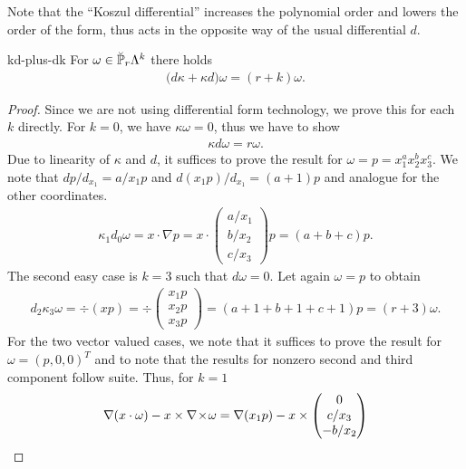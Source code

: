 Note that the ``Koszul differential'' increases the polynomial order
and lowers the order of the form, thus acts in the opposite way of the
usual differential $d$.

\begin{Lemma}{kd-plus-dk}
  For $\omega\in \breve \P_r\Lambda^k$ there holds
  \begin{gather}
    \label{eq:derham:15}
    \bigl(d\kappa+\kappa d\bigr)\omega = (r+k) \omega.
  \end{gather}
\end{Lemma}

\begin{proof}
  Since we are not using differential form technology, we prove this
  for each $k$ directly. For $k=0$, we have $\kappa\omega = 0$, thus
  we have to show
  \begin{gather*}
    \kappa d\omega = r\omega.
  \end{gather*}
  Due to linearity of $\kappa$ and $d$, it suffices to prove the
  result for $\omega = p=x_1^ax_2^bx_3^c$. We note that $dp/d_{x_1} =
  a/x_1 p$ and $d(x_1 p)/d_{x_1} = (a+1) p$ and analogue for the other
  coordinates.
  \begin{gather*}
    \kappa_1 d_0\omega = x\cdot \nabla p = x\cdot
    \begin{pmatrix}
      a/x_1\\b/x_2\\c/x_3
    \end{pmatrix}p
    = (a+b+c)p.
  \end{gather*}
  The second easy case is $k=3$ such that $d\omega = 0$. Let again
  $\omega = p$ to obtain
  \begin{gather*}
    d_2\kappa_3 \omega = \div(xp) = \div
    \begin{pmatrix}
      x_1 p \\x_2 p \\x_3 p
    \end{pmatrix}
    = (a+1+b+1+c+1) p = (r+3) \omega.
  \end{gather*}
  For the two vector valued cases, we note that it suffices to prove
  the result for $\omega = (p,0,0)^T$ and to note that the results for
  nonzero second and third component follow suite. Thus, for $k=1$
  \begin{multline*}
    \nabla (x\cdot \omega) - x\times \curl \omega
    = \nabla(x_1 p) - x\times
    \begin{pmatrix}
      0\\c/x_3 \\ -b/x_2

\end{pmatrix}
\end{multline*}
\end{proof}
